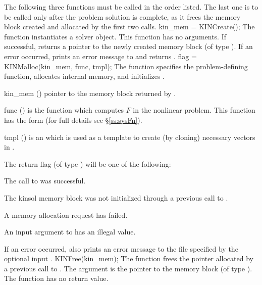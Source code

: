 The following three functions must be called in the order listed. The last one
is to be called only after the problem solution is complete, as it frees the
{\kinsol} memory block created and allocated by the first two calls.
{
  kin\_mem = KINCreate();
}
{
  The function  instantiates a {\kinsol} solver object.
}
{
  This function has no arguments.
}
{
  If successful,  returns a pointer to the newly created 
  {\kinsol} memory block (of type ).
  If an error occurred,  prints an error message to 
  and returns .
}
{}
{
flag = KINMalloc(kin\_mem, func, tmpl);
}
{
  The function  specifies the problem-defining
  function, allocates internal memory, and initializes {\kinsol}.
}
{
  \begin{args}
  \item[kin\_mem] ()
    pointer to the {\kinsol} memory block returned by .
  \item[func] ()
    is the {\C} function which computes $F$ in the nonlinear problem. 
    This function has the form  
    (for full details see \S\ref{ss:sysFn}).
  \item[tmpl] ()
    is an  which is used as a template to create (by cloning)
    necessary vectors in .
  \end{args}
}
{
  The return flag  (of type ) will be one of the following:
  \begin{args}
  \item[\Id{KIN\_SUCCESS}]
    The call to  was successful.
  \item[\Id{KIN\_MEM\_NULL}] 
    The {kinsol} memory block was not initialized through a previous call
    to .
  \item[\Id{KIN\_MEM\_FAIL}] 
    A memory allocation request has failed.
  \item[\Id{KIN\_ILL\_INPUT}] 
    An input argument to  has an illegal value.
  \end{args}
}
{
  If an error occurred,  also prints an error message to the
  file specified by the optional input .
}
{
  KINFree(kin\_mem);
}
{
  The function  frees the pointer allocated by
  a previous call to .
}
{
  The argument is the pointer to the {\kinsol} memory block (of type ).
}
{
  The function  has no return value.
}
{}

